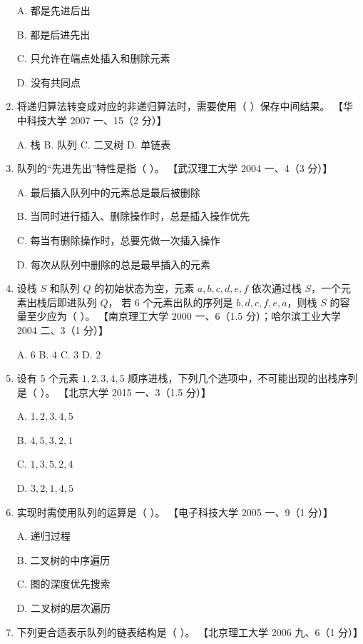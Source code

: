\documentclass[lang=cn,newtx,10pt,scheme=chinese]{elegantbook}
\begin{document}
\begin{enumerate}
    A. 都是先进后出  

    B. 都是后进先出  

    C. 只允许在端点处插入和删除元素  

    D. 没有共同点  

    \item 将递归算法转变成对应的非递归算法时，需要使用（ ）保存中间结果。  
    【华中科技大学 2007 一、15（2 分）】  

    A. 栈 \quad B. 队列 \quad C. 二叉树 \quad D. 单链表  

    \item 队列的“先进先出”特性是指（ ）。  
    【武汉理工大学 2004 一、4（3 分）】  

    A. 最后插入队列中的元素总是最后被删除  

    B. 当同时进行插入、删除操作时，总是插入操作优先  

    C. 每当有删除操作时，总要先做一次插入操作  

    D. 每次从队列中删除的总是最早插入的元素  

    \item 设栈 $S$ 和队列 $Q$ 的初始状态为空，元素 $a, b, c, d, e, f$ 依次通过栈 $S$，一个元素出栈后即进队列 $Q$，
    若 6 个元素出队的序列是 $b, d, c, f, e, a$，则栈 $S$ 的容量至少应为（ ）。  
    【南京理工大学 2000 一、6（1.5 分）；哈尔滨工业大学 2004 二、3（1 分）】

    A. $6$ \quad B. $4$ \quad C. $3$ \quad D. $2$  

    \item 设有 5 个元素 $1, 2, 3, 4, 5$ 顺序进栈，下列几个选项中，不可能出现的出栈序列是（ ）。  
    【北京大学 2015 一、3（1.5 分）】  

    A. $1,2,3,4,5$  

    B. $4,5,3,2,1$ 

    C. $1,3,5,2,4$  

    D. $3,2,1,4,5$  

    \item 实现时需使用队列的运算是（ ）。  
    【电子科技大学 2005 一、9（1 分）】  

    A. 递归过程  

    B. 二叉树的中序遍历  

    C. 图的深度优先搜索 

    D. 二叉树的层次遍历  

    \item 下列更合适表示队列的链表结构是（ ）。  
    【北京理工大学 2006 九、6（1 分）】  


\end{enumerate}
\end{document}
